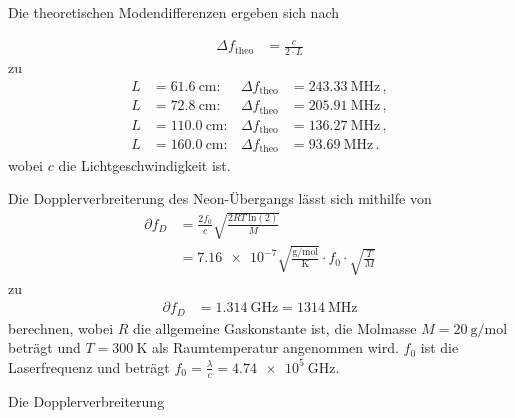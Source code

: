 Die theoretischen Modendifferenzen ergeben sich nach

\begin{align*}
  \Delta f_{\text{theo}} &= \frac{c}{2 \cdot L}
\end{align*}
zu 
\begin{align*}
  L &= \SI{ 61.6}{\centi\meter}: & \Delta f_\text{theo} &= \SI{243.33}{\mega\hertz}\, , \\  
  L &= \SI{ 72.8}{\centi\meter}: & \Delta f_\text{theo} &= \SI{205.91}{\mega\hertz}\, , \\  
  L &= \SI{110.0}{\centi\meter}: & \Delta f_\text{theo} &= \SI{136.27}{\mega\hertz}\, , \\
  L &= \SI{160.0}{\centi\meter}: & \Delta f_\text{theo} &= \SI{93.69}{\mega\hertz}\, . 
\end{align*}
wobei $c$ die Lichtgeschwindigkeit ist.

Die Dopplerverbreiterung des Neon-Übergangs lässt sich mithilfe von 
\begin{align*}
  \partial f_D &= \frac{2f_0}{c} \sqrt{\frac{2RT\: \text{ln}(2)}{M}} \\
  &= \num{7.16e-7}\sqrt{\frac{\si{\gram\per\mol}}{\si{\kelvin}}} \cdot f_0 \cdot \sqrt{\frac{T}{M}}
\end{align*}
zu 
\begin{align*}
  \partial f_D &= \SI{1.314}{\giga\hertz} = \SI{1314}{\mega\hertz}
\end{align*}
berechnen, wobei $R$ die allgemeine Gaskonstante ist, die Molmasse
$M = \SI{20}{\gram\per\mol}$ beträgt und $T=\qty{300}{\kelvin}$ als Raumtemperatur angenommen wird.
$f_0$ ist die Laserfrequenz und beträgt $f_0= \frac{\lambda}{c} = \SI{4.74e5}{\giga\hertz}$.

Die Dopplerverbreiterung

